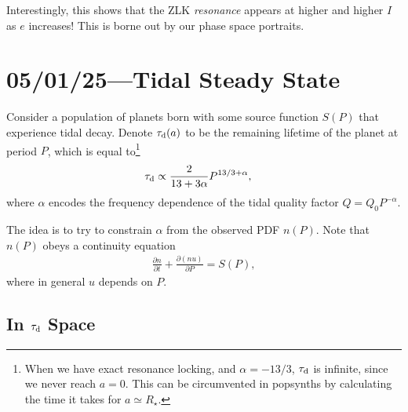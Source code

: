 \documentclass[12pt]{article}
\newcommand*{\pd}[2]{\frac{\partial#1}{\partial#2}}
\begin{document}
Interestingly, this shows that the ZLK \emph{resonance} appears at higher and
higher $I$ as $e$ increases!
This is borne out by our phase space portraits.

\clearpage

\section{05/01/25---Tidal Steady State}

Consider a population of planets born with some source function $S(P)$ that
experience tidal decay.
Denote $\tau_{\rm d}(a)$ to be the remaining lifetime of the planet at period
$P$, which is equal to\footnote{When we have exact resonance locking, and
$\alpha = -13/3$, $\tau_{\rm d}$ is infinite, since we never reach $a=0$.
This can be circumvented in popsynths by calculating the time it takes for $a
\simeq R_\star$.}
\begin{align}
    \tau_{\rm d}
        &\propto
            \frac{2}{13 + 3\alpha}P^{13/3 + \alpha},
\end{align}
where $\alpha$ encodes the frequency dependence of the tidal quality factor $Q =
Q_0 P^{-\alpha}$.

The idea is to try to constrain $\alpha$ from the observed PDF $n(P)$.
Note that $n(P)$ obeys a continuity equation
\begin{align}
    \pd{n}{t}
        + \pd{(nu)}{P}
        = S(P),
\end{align}
where in general $u$ depends on $P$.

\subsection{In $\tau_{\rm d}$ Space}
\end{document}
